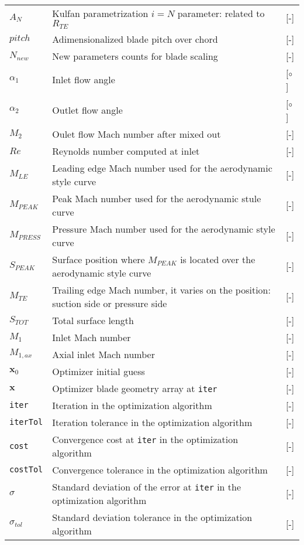 \documentclass{config/polimiThesis}
\begin{document}
\begin{longtable}{p{2.5cm}p{8cm}p{2.5cm}}
    $A_N$ & Kulfan parametrization $i = N$ parameter: related to $R_{TE}$ & [-] \\
    $pitch$ & Adimensionalized blade pitch over chord & [-] \\
    $N_{new}$ & New parameters counts for blade scaling & [-] \\
    $\alpha_1$ & Inlet flow angle & [$\circ$] \\
    $\alpha_2$ & Outlet flow angle & [$\circ$] \\
    $M_2$ & Oulet flow Mach number after mixed out & [-] \\
    $Re$ & Reynolds number computed at inlet & [-] \\
    $M_{LE}$ & Leading edge Mach number used for the aerodynamic style curve & [-] \\
    $M_{PEAK}$ & Peak Mach number used for the aerodynamic stule curve & [-] \\
    $M_{PRESS}$ & Pressure Mach number used for the aerodynamic style curve & [-] \\
    $S_{PEAK}$ & Surface position where $M_{PEAK}$ is located over the aerodynamic style curve & [-] \\
    $M_{TE}$ & Trailing edge Mach number, it varies on the position: suction side or pressure side & [-] \\
    $S_{TOT}$ & Total surface length & [-] \\
    $M_1$ & Inlet Mach number & [-] \\
    $M_{1, ax}$ & Axial inlet Mach number & [-] \\
    $\boldsymbol{x}_0$ & Optimizer initial guess & [-] \\ 
    $\boldsymbol{x}$ & Optimizer blade geometry array at \texttt{iter} & [-] \\
    \texttt{iter} & Iteration in the optimization algorithm & [-] \\
    \texttt{iterTol} & Iteration tolerance in the optimization algorithm & [-] \\
    \texttt{cost} & Convergence cost at \texttt{iter} in the optimization algorithm & [-] \\
    \texttt{costTol} & Convergence tolerance in the optimization algorithm & [-] \\
    $\sigma$ & Standard deviation of the error at \texttt{iter} in the optimization algorithm & [-] \\
    $\sigma_{tol}$ & Standard deviation tolerance in the optimization algorithm & [-] \\

\end{longtable}
\end{document}
